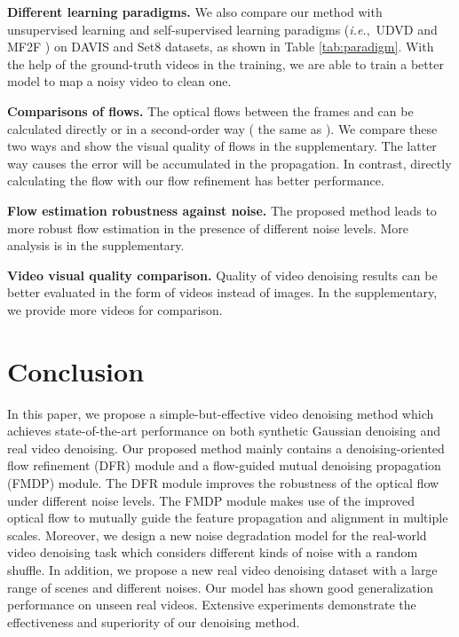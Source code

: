 \documentclass[10pt,twocolumn,letterpaper]{article}
\def\ie{\mbox{\textit{i.e.}, }}
\newlength \g
\begin{document}
\vspace{0.5mm}
\noindent\textbf{Different learning paradigms.}
We also compare our method with unsupervised learning and self-supervised learning paradigms (\ie UDVD \cite{sheth2021unsupervised} and MF2F \cite{dewil2021self}) on DAVIS and Set8 datasets, as shown in Table \ref{tab:paradigm}. 
With the help of the ground-truth videos in the training, we are able to train a better model to map a noisy video to clean one.

\vspace{0.5mm}
\noindent\textbf{Comparisons of flows.}
The optical flows between the frames  and  can be calculated directly or in a second-order way ( the same as \cite{chan2021basicvsrpp}).
We compare these two ways and show the visual quality of flows in the supplementary.
The latter way causes the error will be accumulated in the propagation.
In contrast, directly calculating the flow with our flow refinement has better performance.


\noindent\textbf{Flow estimation robustness against noise.}
The proposed method leads to more robust flow estimation in the presence of different noise levels. More analysis is in the supplementary.


\noindent\textbf{Video visual quality comparison.}
Quality of video denoising results can be better evaluated in the form of videos instead of images. In the supplementary, we provide more videos for comparison.

\section{Conclusion}
\vspace{-1mm}
In this paper, we propose a simple-but-effective video denoising method which achieves state-of-the-art performance on both synthetic Gaussian denoising and real video denoising.
Our proposed method mainly contains a denoising-oriented flow refinement (DFR) module and a flow-guided mutual denoising propagation (FMDP) module.
The DFR module improves the robustness of the optical flow under different noise levels.
The FMDP module makes use of the improved optical flow to mutually guide the feature propagation and alignment in multiple scales.
Moreover, we design a new noise degradation model for the real-world video denoising task which considers different kinds of noise with a random shuffle.
In addition, we propose a new real video denoising dataset with a large range of scenes and different noises.
Our model has shown good generalization performance on unseen real videos.
Extensive experiments demonstrate the effectiveness and superiority of our denoising method.
\end{document}
